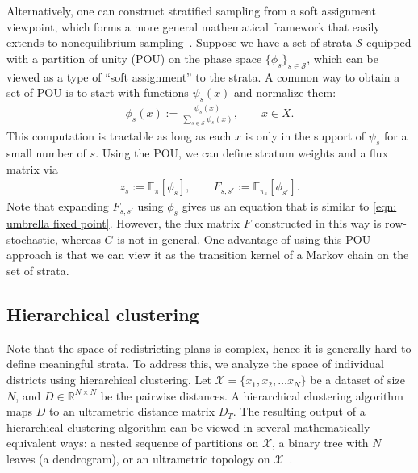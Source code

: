 Alternatively, one can construct stratified sampling from a soft assignment viewpoint, which forms a more general mathematical framework that easily extends to nonequilibrium sampling~\cite{dinner2018trajectory}.
Suppose we have a set of strata $\mathcal{S}$ equipped with a partition of unity (POU) on the phase space $\{\phi_s\}_{s\in \mathcal{S}}$, which can be viewed as a type of ``soft assignment'' to the strata.
A common way to obtain a set of POU is to start with functions $\psi_s(x)$ and normalize them:
    \begin{align}
        \phi_s(x):=\frac{\psi_s(x)}{\sum_{s\in\mathcal{S}}\psi_s(x)},\quad\quad x\in X.
    \end{align}
This computation is tractable as long as each $x$ is only in the support of $\psi_s$ for a small number of $s$.
Using the POU, we can define stratum weights and a flux matrix via
    \begin{align}
        z_s:=\mathbb{E}_\pi[\phi_s],\quad\quad F_{s,s'}:=\mathbb{E}_{\pi_s}[\phi_{s'}].
    \end{align}
Note that expanding $F_{s,s'}$ using $\phi_s$ gives us an equation that is similar to \eqref{eqn: umbrella fixed point}.
However, the flux matrix $F$ constructed in this way is row-stochastic, whereas $G$ is not in general.
One advantage of using this POU approach is that we can view it as the transition kernel of a Markov chain on the set of strata.



\subsection{Hierarchical clustering}\label{subsec:hierarchical_clustering}
Note that the space of redistricting plans is complex, hence it is generally hard to define meaningful strata.
To address this, we analyze the space of individual districts using hierarchical clustering.
Let $\mathcal{X}=\{x_1,x_2,\dots x_N\}$ be a dataset of size $N$, and $D\in\mathbb{R}^{N\times N}$ be the pairwise distances.
A hierarchical clustering algorithm maps $D$ to an ultrametric distance matrix $D_T$.
The resulting output of a hierarchical clustering algorithm can be viewed in several mathematically equivalent ways: a nested sequence of partitions on $\mathcal{X}$, a binary tree with $N$ leaves (a dendrogram), or an ultrametric topology on $\mathcal{X}$~\cite{murtagh2012algorithms}. 

